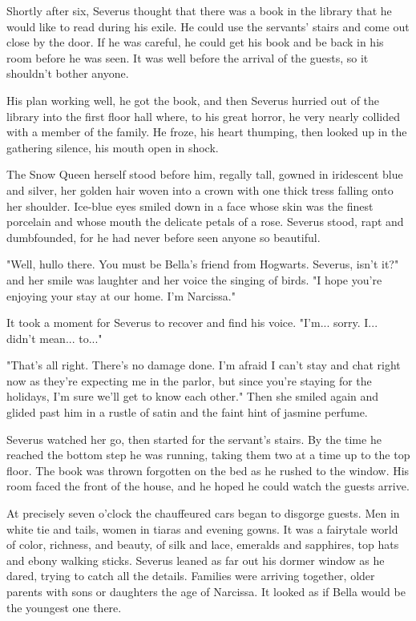 \documentclass[a4paper,11pt]{article}
\begin{document}
Shortly after six, Severus thought that there was a book in the library that he would like to read during his exile. He could use the servants' stairs and come out close by the door. If he was careful, he could get his book and be back in his room before he was seen. It was well before the arrival of the guests, so it shouldn't bother anyone.

His plan working well, he got the book, and then Severus hurried out of the library into the first floor hall where, to his great horror, he very nearly collided with a member of the family. He froze, his heart thumping, then looked up in the gathering silence, his mouth open in shock.

The Snow Queen herself stood before him, regally tall, gowned in iridescent blue and silver, her golden hair woven into a crown with one thick tress falling onto her shoulder. Ice-blue eyes smiled down in a face whose skin was the finest porcelain and whose mouth the delicate petals of a rose. Severus stood, rapt and dumbfounded, for he had never before seen anyone so beautiful.

"Well, hullo there. You must be Bella's friend from Hogwarts. Severus, isn't it?" and her smile was laughter and her voice the singing of birds. "I hope you're enjoying your stay at our home. I'm Narcissa."

It took a moment for Severus to recover and find his voice. "I'm... sorry. I... didn't mean... to..."

"That's all right. There's no damage done. I'm afraid I can't stay and chat right now as they're expecting me in the parlor, but since you're staying for the holidays, I'm sure we'll get to know each other." Then she smiled again and glided past him in a rustle of satin and the faint hint of jasmine perfume.

Severus watched her go, then started for the servant's stairs. By the time he reached the bottom step he was running, taking them two at a time up to the top floor. The book was thrown forgotten on the bed as he rushed to the window. His room faced the front of the house, and he hoped he could watch the guests arrive.

At precisely seven o'clock the chauffeured cars began to disgorge guests. Men in white tie and tails, women in tiaras and evening gowns. It was a fairytale world of color, richness, and beauty, of silk and lace, emeralds and sapphires, top hats and ebony walking sticks. Severus leaned as far out his dormer window as he dared, trying to catch all the details. Families were arriving together, older parents with sons or daughters the age of Narcissa. It looked as if Bella would be the youngest one there.
\end{document}
